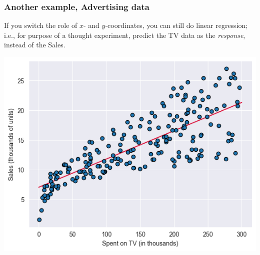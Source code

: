 \documentclass{beamer}
\theoremstyle{example}
\begin{document}
\begin{frame}[fragile]
\frametitle{Another example, Advertising data}
If you switch the role of $x$- and $y$-coordinates, you can still do linear regression; i.e., for purpose of a thought experiment, predict the TV data as the \emph{response}, instead of the Sales.


\vspace*{12pt}
\centering
\includegraphics[height=0.4\textheight]{advertising-plot1.png}

\end{frame}
    
\end{document}
